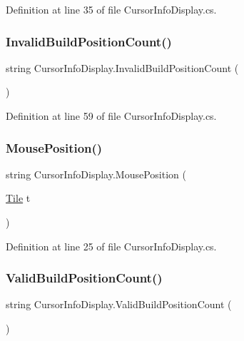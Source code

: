 Definition at line 35 of file Cursor\+Info\+Display.\+cs.

\mbox{\label{class_cursor_info_display_ad7eebf309a8eae30a13155cefe80b198}} 
\subsubsection{\texorpdfstring{Invalid\+Build\+Position\+Count()}{InvalidBuildPositionCount()}}
{\footnotesize\ttfamily string Cursor\+Info\+Display.\+Invalid\+Build\+Position\+Count (\begin{DoxyParamCaption}{ }\end{DoxyParamCaption})}



Definition at line 59 of file Cursor\+Info\+Display.\+cs.

\mbox{\label{class_cursor_info_display_a850e2aa1a8a481ba1041b48328289cc7}} 
\subsubsection{\texorpdfstring{Mouse\+Position()}{MousePosition()}}
{\footnotesize\ttfamily string Cursor\+Info\+Display.\+Mouse\+Position (\begin{DoxyParamCaption}\item[{\hyperlink{class_tile}{Tile}}]{t }\end{DoxyParamCaption})}



Definition at line 25 of file Cursor\+Info\+Display.\+cs.

\mbox{\label{class_cursor_info_display_af0c4886130f3618be3c05c4642208d38}} 
\subsubsection{\texorpdfstring{Valid\+Build\+Position\+Count()}{ValidBuildPositionCount()}}
{\footnotesize\ttfamily string Cursor\+Info\+Display.\+Valid\+Build\+Position\+Count (\begin{DoxyParamCaption}{ }\end{DoxyParamCaption})}



